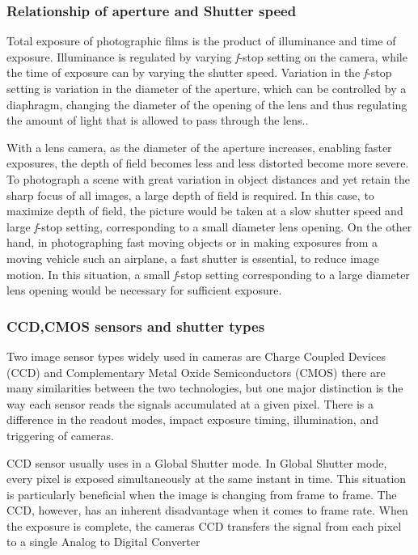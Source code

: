 \subsubsection{Relationship of aperture and Shutter speed}
Total exposure of photographic films is the product of illuminance and time of exposure.
Illuminance is regulated by varying \textit{f}-stop setting on the camera, while the time of exposure can by varying the shutter speed. Variation in the \textit{f}-stop setting is variation in the diameter of the aperture, which can be controlled by a diaphragm, changing the diameter of the opening of the lens and thus regulating the amount of light that is allowed to pass through the lens.\cite{elements_photogrammetry}.

With a lens camera, as the diameter of the aperture increases, enabling faster exposures, the depth of field becomes less and less distorted become more severe. To photograph a scene with great variation in object distances and yet retain the sharp focus of all images, a large depth of field is required. In this case, to maximize depth of field, the picture would be taken at a slow shutter speed and large \textit{f}-stop setting, corresponding to a small diameter lens opening. On the other hand, in photographing fast moving objects or in making exposures from a moving vehicle such an airplane, a fast shutter is essential, to reduce image motion. In this situation, a small \textit{f}-stop setting corresponding to a large diameter lens opening would be necessary for sufficient exposure.\cite{Planning_airborne}
\subsubsection{CCD,CMOS sensors and shutter types}
Two image sensor types widely used in cameras are Charge Coupled Devices (CCD) and Complementary Metal Oxide Semiconductors (CMOS) there are many similarities between the two technologies, but one major distinction is the way each sensor reads the signals accumulated at a given pixel. There is a difference in the readout modes, impact exposure timing, illumination, and triggering of cameras.

CCD sensor usually uses in a Global Shutter mode. In Global Shutter mode, every pixel is exposed simultaneously at the same instant in time. This situation is particularly beneficial when the image is changing from frame to frame. The CCD, however, has an inherent disadvantage when it comes to frame rate. When the exposure is complete, the cameras CCD transfers the signal from each pixel to a single Analog to Digital Converter

